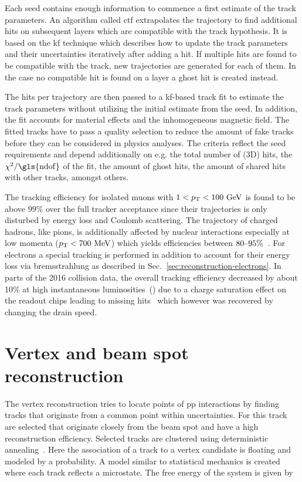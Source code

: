 Each seed contains enough information to commence a first estimate of the track parameters. An algorithm called \gls{ctf} extrapolates the trajectory to find additional hits on subsequent layers which are compatible with the track hypothesis. It is based on the \gls{kf} technique which describes how to update the track parameters and their uncertainties iteratively after adding a hit. If multiple hits are found to be compatible with the track, new trajectories are generated for each of them. In the case no compatible hit is found on a layer a ghost hit is created instead.

The hits per trajectory are then passed to a \gls{kf}-based track fit to estimate the track parameters without utilizing the initial estimate from the seed. In addition, the fit accounts for material effects and the inhomogeneous magnetic field.  The fitted tracks have to pass a quality selection to reduce the amount of fake tracks before they can be considered in physics analyses. The criteria reflect the seed requirements and depend additionally on e.g. the total number of (3D) hits, the $\chi^2/\mathrm{\gls{ndof}}$ of the fit, the amount of ghost hits, the amount of shared hits with other tracks, amongst others.

The tracking efficiency for isolated muons with $1<p_\mathrm{T}<100~\mathrm{GeV}$ is found to be above $99\%$ over the full tracker acceptance since their trajectories is only disturbed by energy loss and Coulomb scattering. The trajectory of charged hadrons, like pions, is additionally affected by nuclear interactions especially at low momenta ($p_\mathrm{T}<700~\mathrm{MeV}$) which yields efficiencies between $80\text{--}95\%$~\cite{Chatrchyan:2014fea}. For electrons a special tracking is performed in addition to account for their energy loss via bremsstrahlung as described in Sec.~\ref{sec:reconstruction-electrons}. In parts of the 2016 collision data, the overall tracking efficiency decreased by about 10\% at high instantaneous luminosities~() due to a charge saturation effect on the readout chips leading to missing hits~\cite{CMS-DP-2016-043} which however was recovered by changing the drain speed.


\section{Vertex and beam spot reconstruction}


The vertex reconstruction tries to locate points of pp interactions by finding tracks that originate from a common point within uncertainties. For this track are selected that originate closely from the beam spot and have a high reconstruction efficiency. Selected tracks are clustered using deterministic annealing~\cite{726788}. Here the association of a track to a vertex candidate is floating and modeled by a probability. A model similar to statistical mechanics is created where each track reflects a microstate. The free energy of the system is given by

